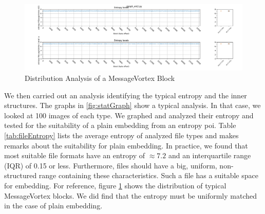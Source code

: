 \begin{figure}[ht]
	\includegraphics[width=\textwidth]{inc/statanalysis_mv}
	\caption{Distribution Analysis of a MessageVortex Block}
	\label{fig:statMvGraph}
\end{figure}

We then carried out an analysis identifying the typical entropy and the inner structures. The graphs in \ref{fig:statGraph} show a typical analysis. In that case, we looked at 100 images of each type. We graphed and analyzed their entropy and tested for the suitability of a plain embedding from an entropy poi. Table \ref{tab:fileEntropy} lists the average entropy of analyzed file types and makes remarks about the suitability for plain embedding. In practice, we found that most suitable file formats have an entropy of $\approx 7.2$ and an interquartile range (IQR) of 0.15 or less. Furthermore, files should have a big, uniform, non-structured range containing these characteristics. Such a file has a suitable space for embedding. For reference, figure \ref{fig:statMvGraph} shows the distribution of typical MessageVortex blocks. We did find that the entropy must be uniformly matched in the case of plain embedding.

